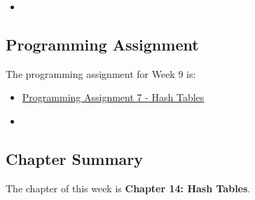 \begin{itemize}
    \item {}
\end{itemize}

\subsection{Programming Assignment}

The programming assignment for Week 9 is:

\begin{itemize}
    \item \href{https://github.com/QuantumCompiler/CU/tree/main/CSPB%202270%20-%20Data%20Structures/Assignments/Assignment%207%20-%20Hash%20Table}{Programming Assignment 7 - Hash Tables}
    \item {}
\end{itemize}

\subsection{Chapter Summary}

The chapter of this week is \textbf{Chapter 14: Hash Tables}.

